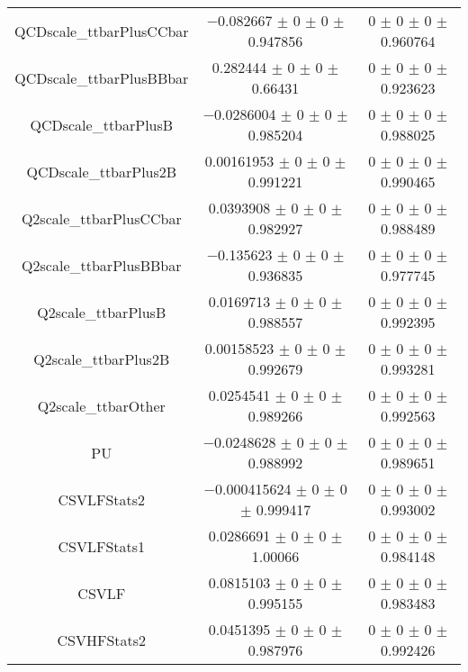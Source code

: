 \begin{table}
\begin{tabular}{ccc}
QCDscale\_ttbarPlusCCbar 	& \num{-0.082667} $\pm$ \num{0} $\pm$ \num{0} $\pm$ \num{0.947856} 	& \num{0} $\pm$ \num{0} $\pm$ \num{0} $\pm$ \num{0.960764}\\
QCDscale\_ttbarPlusBBbar 	& \num{0.282444} $\pm$ \num{0} $\pm$ \num{0} $\pm$ \num{0.66431} 	& \num{0} $\pm$ \num{0} $\pm$ \num{0} $\pm$ \num{0.923623}\\
QCDscale\_ttbarPlusB 	& \num{-0.0286004} $\pm$ \num{0} $\pm$ \num{0} $\pm$ \num{0.985204} 	& \num{0} $\pm$ \num{0} $\pm$ \num{0} $\pm$ \num{0.988025}\\
QCDscale\_ttbarPlus2B 	& \num{0.00161953} $\pm$ \num{0} $\pm$ \num{0} $\pm$ \num{0.991221} 	& \num{0} $\pm$ \num{0} $\pm$ \num{0} $\pm$ \num{0.990465}\\
Q2scale\_ttbarPlusCCbar 	& \num{0.0393908} $\pm$ \num{0} $\pm$ \num{0} $\pm$ \num{0.982927} 	& \num{0} $\pm$ \num{0} $\pm$ \num{0} $\pm$ \num{0.988489}\\
Q2scale\_ttbarPlusBBbar 	& \num{-0.135623} $\pm$ \num{0} $\pm$ \num{0} $\pm$ \num{0.936835} 	& \num{0} $\pm$ \num{0} $\pm$ \num{0} $\pm$ \num{0.977745}\\
Q2scale\_ttbarPlusB 	& \num{0.0169713} $\pm$ \num{0} $\pm$ \num{0} $\pm$ \num{0.988557} 	& \num{0} $\pm$ \num{0} $\pm$ \num{0} $\pm$ \num{0.992395}\\
Q2scale\_ttbarPlus2B 	& \num{0.00158523} $\pm$ \num{0} $\pm$ \num{0} $\pm$ \num{0.992679} 	& \num{0} $\pm$ \num{0} $\pm$ \num{0} $\pm$ \num{0.993281}\\
Q2scale\_ttbarOther 	& \num{0.0254541} $\pm$ \num{0} $\pm$ \num{0} $\pm$ \num{0.989266} 	& \num{0} $\pm$ \num{0} $\pm$ \num{0} $\pm$ \num{0.992563}\\
PU 	& \num{-0.0248628} $\pm$ \num{0} $\pm$ \num{0} $\pm$ \num{0.988992} 	& \num{0} $\pm$ \num{0} $\pm$ \num{0} $\pm$ \num{0.989651}\\
CSVLFStats2 	& \num{-0.000415624} $\pm$ \num{0} $\pm$ \num{0} $\pm$ \num{0.999417} 	& \num{0} $\pm$ \num{0} $\pm$ \num{0} $\pm$ \num{0.993002}\\
CSVLFStats1 	& \num{0.0286691} $\pm$ \num{0} $\pm$ \num{0} $\pm$ \num{1.00066} 	& \num{0} $\pm$ \num{0} $\pm$ \num{0} $\pm$ \num{0.984148}\\
CSVLF 	& \num{0.0815103} $\pm$ \num{0} $\pm$ \num{0} $\pm$ \num{0.995155} 	& \num{0} $\pm$ \num{0} $\pm$ \num{0} $\pm$ \num{0.983483}\\
CSVHFStats2 	& \num{0.0451395} $\pm$ \num{0} $\pm$ \num{0} $\pm$ \num{0.987976} 	& \num{0} $\pm$ \num{0} $\pm$ \num{0} $\pm$ \num{0.992426}\\

\end{tabular}
\end{table}
